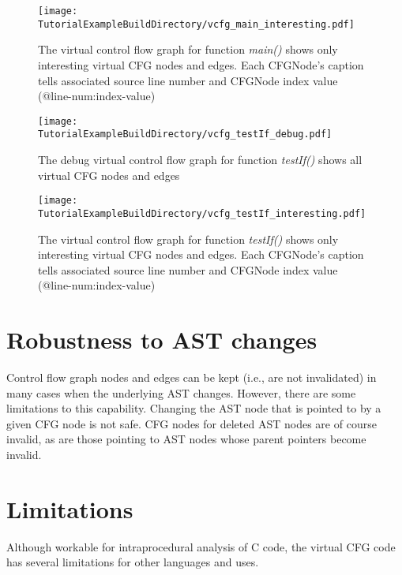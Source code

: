\begin{figure}
\texttt{[image: \\TutorialExampleBuildDirectory/vcfg\_main\_interesting.pdf]}
\caption{The virtual control flow graph for function \textit{main()} shows only interesting virtual
CFG nodes and edges. Each CFGNode's caption tells associated source line
number and CFGNode index value (@line-num:index-value)  }
\label{tutorial:exampleOutputCodeMainInterestingPDF}
\end{figure}


\begin{figure}
\texttt{[image: \\TutorialExampleBuildDirectory/vcfg\_testIf\_debug.pdf]}
\caption{The debug virtual control flow graph for function \textit{testIf()} shows all virtual CFG nodes
and edges}
\label{tutorial:exampleOutputCodeDebugPDF}
\end{figure}


\begin{figure}
\texttt{[image: \\TutorialExampleBuildDirectory/vcfg\_testIf\_interesting.pdf]}
\caption{The virtual control flow graph for function \textit{testIf()} shows only interesting virtual
CFG nodes and edges. Each CFGNode's caption tells associated source line
number and CFGNode index value (@line-num:index-value)  }
\label{tutorial:exampleOutputCodeInterestingPDF}
\end{figure}

\clearpage
\section{Robustness to AST changes}

Control flow graph nodes and edges can be kept (i.e., are not invalidated)
in many cases when the underlying AST changes.  However, there are some
limitations to this capability.  Changing the AST node that is pointed to
by a given CFG node is not safe.  CFG nodes for deleted AST nodes are of
course invalid, as are those pointing to AST nodes whose parent pointers
become invalid.

\section{Limitations}

Although workable for intraprocedural analysis of C code, the virtual CFG
code has several limitations for other languages and uses.

